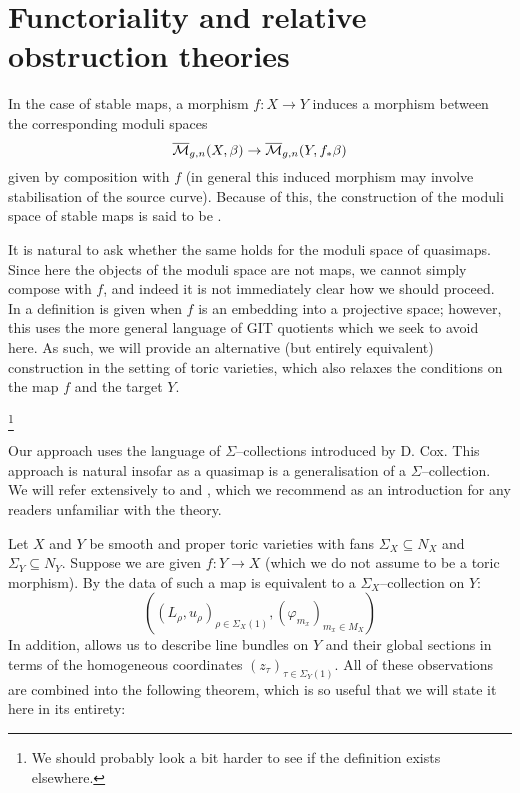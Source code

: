\section{Functoriality and relative obstruction theories} \label{Functoriality of Quasimap Spaces Section}

In the case of stable maps, a morphism $f : X \to Y$ induces a morphism between the corresponding moduli spaces
\begin{equation*}\overline{\mathcal M}_{g,n}(X,\beta) \rightarrow \overline{\mathcal M}_{g,n}(Y,f_* \beta) \end{equation*}
given by composition with $f$ (in general this induced morphism may involve stabilisation of the source curve). Because of this, the construction of the moduli space of stable maps is said to be .

It is natural to ask whether the same holds for the moduli space of quasimaps. Since here the objects of the moduli space are not maps, we cannot simply compose with $f$, and indeed it is not immediately clear how we should proceed. In \cite[Section 3.1]{CF-K-wallcrossing} a definition is given when $f$ is an embedding into a projective space; however, this uses the more general language of GIT quotients which we seek to avoid here. As such, we will provide an alternative (but entirely equivalent) construction in the setting of toric varieties, which also relaxes the conditions on the map $f$ and the target $Y$.

\footnote{We should probably look a bit harder to see if the definition exists elsewhere.}

Our approach uses the language of $\Sigma$--collections introduced by D. Cox. This approach is natural insofar as a quasimap is a generalisation of a $\Sigma$--collection. We will refer extensively to \cite{CoxRing} and \cite{CoxFunctor}, which we recommend as an  introduction for any readers unfamiliar with the theory.

Let $X$ and $Y$ be smooth and proper toric varieties with fans $\Sigma_X \subseteq N_X$ and $\Sigma_Y \subseteq N_Y$. Suppose we are given $f : Y \to X$ (which we do not assume to be a toric morphism). By \cite[Theorem 1.1]{CoxFunctor} the data of such a map is equivalent to a $\Sigma_X$--collection on $Y$:
\begin{equation*} ( (L_\rho, u_\rho)_{\rho \in \Sigma_X(1)}, (\varphi_{m_x})_{m_x \in M_X} ) \end{equation*}
In addition, \cite{CoxRing} allows us to describe line bundles on $Y$ and their global sections in terms of the homogeneous coordinates $(z_\tau)_{\tau \in \Sigma_Y(1)}$. All of these observations are combined into the following theorem, which is so useful that we will state it here in its entirety:

